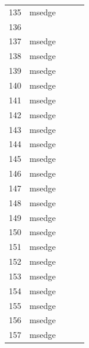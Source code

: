 \documentclass[a4paper,twoside,12pt]{book}
\begin{document}
\begin{appendices}
\begin{table}
\begin{tabular}{lllll}
	135 &         msedge &                &                &                \\
	136 &                &                &                &                \\
	137 &         msedge &                &                &                \\
	138 &         msedge &                &                &                \\
	139 &         msedge &                &                &                \\
	140 &         msedge &                &                &                \\
	141 &         msedge &                &                &                \\
	142 &         msedge &                &                &                \\
	143 &         msedge &                &                &                \\
	144 &         msedge &                &                &                \\
	145 &         msedge &                &                &                \\
	146 &         msedge &                &                &                \\
	147 &         msedge &                &                &                \\
	148 &         msedge &                &                &                \\
	149 &         msedge &                &                &                \\
	150 &         msedge &                &                &                \\
	151 &         msedge &                &                &                \\
	152 &         msedge &                &                &                \\
	153 &         msedge &                &                &                \\
	154 &         msedge &                &                &                \\
	155 &         msedge &                &                &                \\
	156 &         msedge &                &                &                \\
	157 &         msedge &                &                &                \\

\end{tabular}
\end{table}
\end{appendices}
\end{document}
